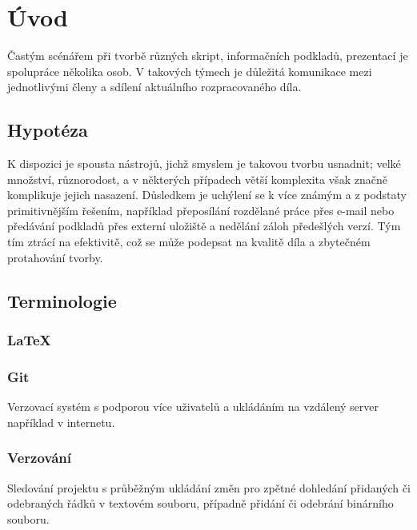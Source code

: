 \chapter{Úvod}
Častým scénářem při tvorbě různých skript, informačních podkladů, prezentací je spolupráce několika osob. V takových týmech je důležitá komunikace mezi jednotlivými členy a sdílení aktuálního rozpracovaného díla.

\section{Hypotéza}

K dispozici je spousta nástrojů, jichž smyslem je takovou tvorbu usnadnit; velké množství, různorodost, a v některých případech větší komplexita však značně komplikuje jejich nasazení. Důsledkem je uchýlení se k více známým a z podstaty primitivnějším řešením, například přeposílání rozdělané práce přes e-mail nebo předávání podkladů přes externí uložiště a nedělání záloh předešlých verzí. Tým tím ztrácí na efektivitě, což se může podepsat na kvalitě díla a zbytečném protahování tvorby.

\section{Terminologie}

\subsection{\LaTeX}

 \cite{latex-def}

\subsection{Git}

Verzovací systém s podporou více uživatelů a ukládáním na vzdálený server například v internetu.

\subsection{Verzování}

Sledování projektu s průběžným ukládání změn pro zpětné dohledání přidaných či odebraných řádků v textovém souboru, případně přidání či odebrání binárního souboru.

